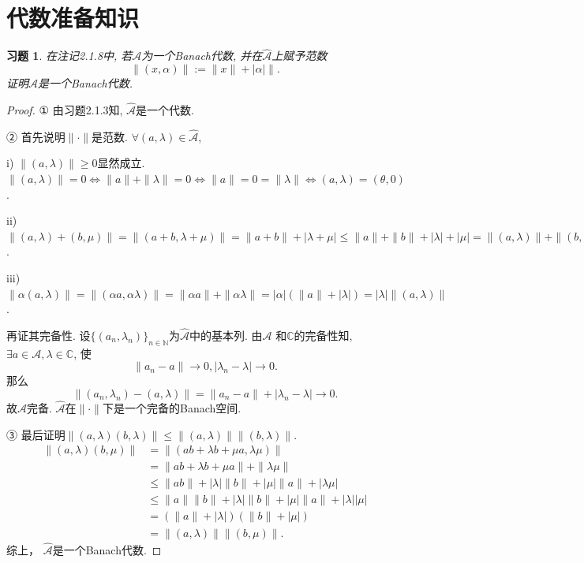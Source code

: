 \documentclass[UTF8,twoside]{ctexbook}
\newtheorem{exercise}{习题}[section]
\newcommand{\h}{\mathscr}
\newcommand{\kx}{\mathbb}
\numberwithin{equation}{section}
\begin{document}
	\section{代数准备知识}
	\begin{exercise}
		在注记2.1.8中, 若$\h A$为一个Banach代数, 并在$\hat {\h A}$上赋予范数
		\[
		\|(x,\alpha)\|:=\|x\|+|\alpha|\|.
		\]
		证明$\hat {\h A}$是一个Banach代数.
	\end{exercise}
	\begin{proof}
		① 由习题2.1.3知, $\hat{\h A}$是一个代数.

		② 首先说明$\|\cdot\|$是范数. $\forall (a,\lambda)\in\hat{\h A}$,

		i) $\|(a,\lambda)\|\geq 0$显然成立. $\|(a,\lambda)\|=0\Leftrightarrow \|a\|+\|\lambda\|=0\Leftrightarrow \|a\|=0=\|\lambda\|\Leftrightarrow (a,\lambda)=(\theta,0)$.

		ii) $\|(a,\lambda)+(b,\mu)\|=\|(a+b,\lambda+\mu)\|=\|a+b\|+|\lambda + \mu|\leq \|a\|+\|b\|+|\lambda|+|\mu|=\|(a,\lambda)\|+\|(b,\mu)\|$.

		iii) $\|\alpha (a,\lambda)\|=\|(\alpha a,\alpha\lambda)\|=\|\alpha a\|+\|\alpha \lambda\|=|\alpha|(\|a\|+|\lambda|)=|\lambda|\|(a,\lambda)\|$.

		再证其完备性. 设$\{(a_n,\lambda_n)\}_{n\in\kx N}$为$\hat {\h A}$中的基本列. 由$\h A$ 和$\kx C$的完备性知, $\exists a\in\h A,\lambda\in\kx C$, 使
		\[
		\|a_n-a\|\rightarrow 0,|\lambda_n-\lambda|\rightarrow 0.
		\]
		那么
		\[
		\|(a_n,\lambda_n)-(a,\lambda)\|=\|a_n-a\|+|\lambda_n-\lambda|\rightarrow 0.
		\]
		故$\hat{\h A}$完备. $\hat{\h A}$在$\|\cdot\|$下是一个完备的Banach空间.

		③ 最后证明$\|(a,\lambda)(b,\lambda)\|\leq\|(a,\lambda)\|\|(b,\lambda)\|$.
		\[
		\begin{aligned}
		\|(a,\lambda)(b,\mu)\|
		&=\|(ab+\lambda b+\mu a,\lambda\mu)\|\\
		&=\|ab+\lambda b+\mu a\|+\|\lambda\mu\|\\
		&\leq \|ab\|+|\lambda|\|b\|+|\mu|\|a\|+|\lambda\mu|\\
		&\leq\|a\|\|b\|+|\lambda|\|b\|+|\mu|\|a\|+|\lambda||\mu|\\
		&=(\|a\|+|\lambda|)(\|b\|+|\mu|)\\
		&=\|(a,\lambda)\|\|(b,\mu)\|.
		\end{aligned}
		\]
		综上， $\hat{\h A}$是一个Banach代数.
	\end{proof}
\end{document}
